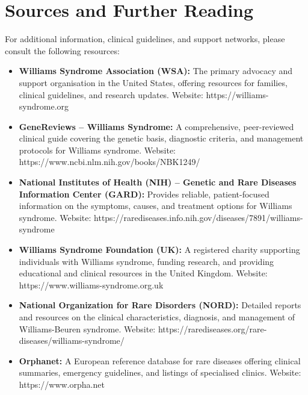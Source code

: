 \section*{Sources and Further Reading}
For additional information, clinical guidelines, and support networks, please consult the following resources:
\begin{itemize}
    \item \textbf{Williams Syndrome Association (WSA):} The primary advocacy and support organisation in the United States, offering resources for families, clinical guidelines, and research updates. Website: https://williams-syndrome.org
    \item \textbf{GeneReviews -- Williams Syndrome:} A comprehensive, peer-reviewed clinical guide covering the genetic basis, diagnostic criteria, and management protocols for Williams syndrome. Website: https://www.ncbi.nlm.nih.gov/books/NBK1249/
    \item \textbf{National Institutes of Health (NIH) -- Genetic and Rare Diseases Information Center (GARD):} Provides reliable, patient-focused information on the symptoms, causes, and treatment options for Williams syndrome. Website: https://rarediseases.info.nih.gov/diseases/7891/williams-syndrome
    \item \textbf{Williams Syndrome Foundation (UK):} A registered charity supporting individuals with Williams syndrome, funding research, and providing educational and clinical resources in the United Kingdom. Website: https://www.williams-syndrome.org.uk
    \item \textbf{National Organization for Rare Disorders (NORD):} Detailed reports and resources on the clinical characteristics, diagnosis, and management of Williams-Beuren syndrome. Website: https://rarediseases.org/rare-diseases/williams-syndrome/
    \item \textbf{Orphanet:} A European reference database for rare diseases offering clinical summaries, emergency guidelines, and listings of specialised clinics. Website: https://www.orpha.net
\end{itemize}